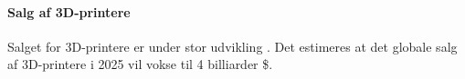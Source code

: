 



\paragraph{Salg af 3D-printere}

Salget for 3D-printere er under stor udvikling \autocite{wohler_sales_2012}. Det estimeres at det globale salg af 3D-printere i 2025 vil vokse til 4 billiarder \$. \autocite[110]{manyika_disruptive_2013}





